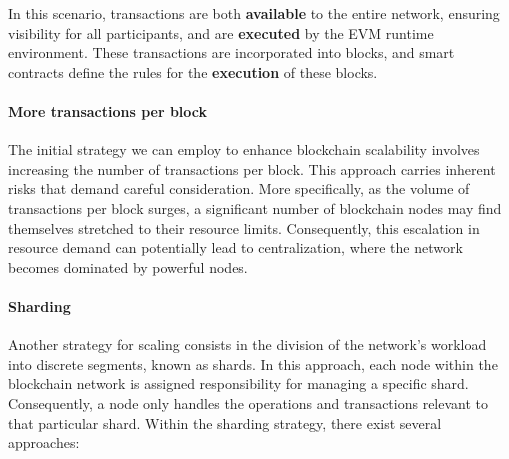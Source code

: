 In this scenario, transactions are both \textbf{available} to the entire network, ensuring visibility for all participants, and are \textbf{executed} by the EVM runtime environment.  These transactions are incorporated into blocks, and smart contracts define the rules for the \textbf{execution} of these blocks.

\paragraph*{More transactions per block}

The initial strategy we can employ to enhance blockchain scalability involves increasing the number of transactions per block. This approach carries inherent risks that demand careful consideration. More specifically, as the volume of transactions per block surges, a significant number of blockchain nodes may find themselves stretched to their resource limits. Consequently, this escalation in resource demand can potentially lead to centralization, where the network becomes dominated by powerful nodes.

\paragraph*{Sharding}

Another strategy for scaling consists in the division of the network's workload into discrete segments, known as shards. In this approach, each node within the blockchain network is assigned responsibility for managing a specific shard. Consequently, a node only handles the operations and transactions relevant to that particular shard. Within the sharding strategy, there exist several approaches:

